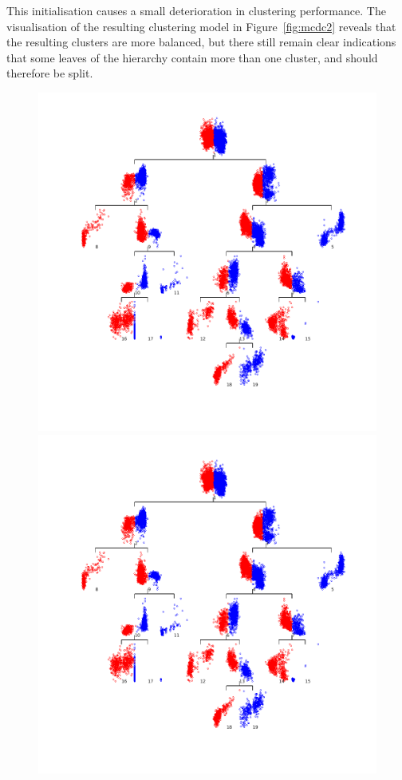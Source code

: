 \documentclass{book}
\begin{document}
\noindent
%
This initialisation causes a small deterioration in clustering performance. The visualisation
of the resulting clustering model in Figure~\ref{fig:mcdc2} reveals that the
resulting clusters are more balanced, but there still remain clear indications that some leaves of the
hierarchy contain more than one cluster, and should therefore be split.
%
\begin{figure}
%
\begin{latexonly}
%
\begin{center}
\includegraphics[scale=0.3]{figures/mcdc3.png}
\end{center}
%
\end{latexonly}
%
\begin{htmlonly}
%
\includegraphics[scale=0.7]{figures/mcdc3.png}

\end{htmlonly}
\end{figure}
\end{document}
